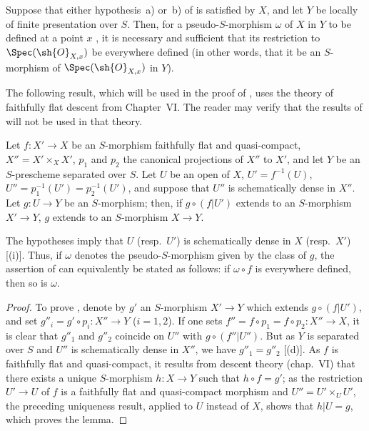 \begin{corollary}[20.3.9]
\label{IV.20.3.9}
Suppose that either hypothesis~a) or~b) of  is satisfied by $X$, and let $Y$ be locally of finite presentation over $S$.
Then, for a pseudo-$S$-morphism $\omega$ of $X$ in $Y$ to be defined at a point $x$ , it is necessary and sufficient that its restriction to $\Spec(\sh{O}_{X,x})$ be everywhere defined (in other words, that it be an $S$-morphism of $\Spec(\sh{O}_{X,x})$ in $Y$).
\end{corollary}

The following result, which will be used in the proof of , uses the theory of faithfully flat descent from Chapter~VI.
The reader may verify that the results of  will not be used in that theory.

\begin{lemma}[20.3.10]
\label{IV.20.3.10}
Let $f:X'\to X$ be an $S$-morphism faithfully flat and quasi-compact, $X''=X'\times_X X'$, $p_1$ and $p_2$ the canonical projections of $X''$ to $X'$, and let $Y$ be an $S$-prescheme separated over $S$.
Let $U$ be an open of $X$, $U'=f^{-1}(U)$, $U''=p_1^{-1}(U')=p_2^{-1}(U')$, and suppose that $U''$ is schematically dense in $X''$.
Let $g:U\to Y$ be an $S$-morphism;
then, if $g\circ(f|U')$ extends to an $S$-morphism $X'\to Y$, $g$ extends to an $S$-morphism $X\to Y$.
\end{lemma}

The hypotheses imply that $U$ (resp.\ $U'$) is schematically dense in $X$ (resp.\ $X'$) [(i)].
Thus, if $\omega$ denotes the pseudo-$S$-morphism given by the class of $g$, the assertion of  can equivalently be stated as follows: if $\omega\circ f$ is everywhere defined, then so is $\omega$.

\begin{proof}
To prove , denote by $g'$ an $S$-morphism $X'\to Y$ which extends $g\circ(f|U')$, and set $g''_i=g'\circ p_i:X''\to Y$ ($i=1,2$).
If one sets $f''=f\circ p_1=f\circ p_2:X''\to X$, it is clear that $g''_1$ and $g''_2$ coincide on $U''$ with $g\circ(f''|U'')$.
But as $Y$ is separated over $S$ and $U''$ is schematically dense in $X''$, we have $g''_1=g''_2$ [(d)].
As $f$ is faithfully flat and quasi-compact, it results from descent theory (chap.~VI) that there exists a unique $S$-morphism $h:X\to Y$ such that $h\circ f=g'$;
as the restriction $U'\to U$ of $f$ is a faithfully flat and quasi-compact morphism and $U''=U'\times_U U'$, the preceding uniqueness result, applied to $U$ instead of $X$, shows that $h|U=g$, which proves the lemma.
\end{proof}

